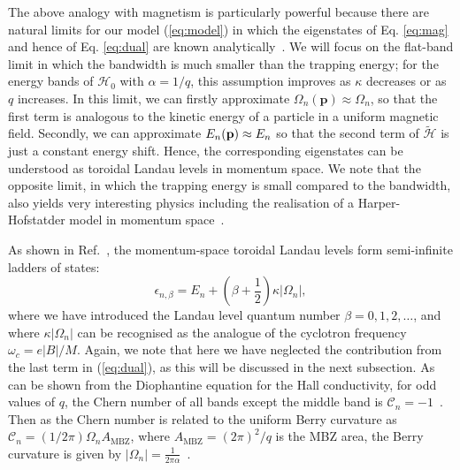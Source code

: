 The above analogy with magnetism is particularly powerful because there are natural limits for our model (\ref{eq:model}) in which the eigenstates of Eq. \ref{eq:mag} and hence of Eq. \ref{eq:dual} are known analytically~\cite{price2014magnetic, ozawa2014momhh, Claassen_prl_2015}. We will focus on the flat-band limit in which the bandwidth is much smaller than the trapping energy; for the energy bands of $\mathcal{H}_0$ with $\alpha = 1/q$, this assumption improves as $\kappa$ decreases or as $q$ increases. In this limit, we can firstly approximate $\Omega_{n}(\mathbf{p}) \approx \Omega_n$, so that the first term is analogous to the kinetic energy of a particle in a uniform magnetic field. Secondly, we can approximate
$E_n(\mathbf{p}) \approx E_n$ so that the second term of $\widetilde{\mathcal{H}}$ is just a constant energy shift. Hence, the corresponding eigenstates can be understood as toroidal Landau levels in momentum space. We note that the opposite limit, in which the trapping energy is small compared to the bandwidth, also yields very interesting physics including the realisation of a Harper-Hofstatder model in momentum space~\cite{ozawa2014momhh, scaffidi2014exact}. 

As shown in Ref.~\cite{price2014magnetic}, the momentum-space toroidal Landau levels form semi-infinite ladders of states:
%
\begin{equation}\label{eq:ladders}
  \epsilon_{n,\beta} = E_n  + \left(\beta + \frac{1}{2}\right) \kappa |\Omega_n|  ,
\end{equation}
where we have introduced the Landau level quantum number
$\beta = 0,1,2,\dots$, and where $\kappa |\Omega_n|$ can be recognised as the analogue of the cyclotron frequency
$\omega_c = e |B| /M $. Again, we note that here we have neglected the contribution from the last term in (\ref{eq:dual}), as this will be discussed in the next subsection. As can be shown from the Diophantine equation for the Hall conductivity, for odd values of $q$, the Chern number of all bands except the middle band is $\mathcal{C}_n = -1$~\cite{bernevig2013topological}. Then as the Chern number is related to the uniform Berry curvature as $\mathcal{C}_n = (1/2\pi) \Omega_n A_{\text{MBZ}}$, where $A_{\text{MBZ}} = (2\pi)^2/q$ is the MBZ area, the Berry curvature is given by $|\Omega_n| = \frac{1}{2\pi\alpha}$~\cite{price2014magnetic}.  

